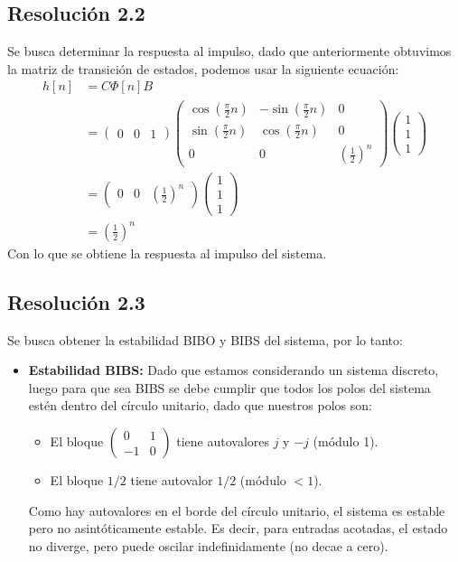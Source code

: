 \documentclass[
  11pt,
  letterpaper,
   addpoints,
   answers
  ]{exam}
\begin{document}
\begin{questions}
\begin{solution}
\subsection*{Resolución 2.2}
Se busca determinar la respuesta al impulso, dado que anteriormente obtuvimos la matriz de transición de estados, podemos usar la siguiente ecuación:
\begin{align}
  h[n]&= C\Phi[n] B\\
  &= \begin{pmatrix} 0 & 0 & 1 \end{pmatrix} \begin{pmatrix} \cos\left(\frac{\pi}{2} n\right) & -\sin\left(\frac{\pi}{2} n\right) & 0 \\ \sin\left(\frac{\pi}{2} n\right) & \cos\left(\frac{\pi}{2} n\right) & 0 \\ 0 & 0 & \left(\frac{1}{2}\right)^n \end{pmatrix} \begin{pmatrix} 1 \\ 1 \\ 1 \end{pmatrix}\\
  &= \begin{pmatrix} 0 & 0 & \left(\frac{1}{2}\right)^n \end{pmatrix} \begin{pmatrix} 1 \\ 1 \\ 1 \end{pmatrix}\\
  &= \left(\frac{1}{2}\right)^n
\end{align}
Con lo que se obtiene la respuesta al impulso del sistema.
\subsection*{Resolución 2.3}
Se busca obtener la estabilidad BIBO y BIBS del sistema, por lo tanto:
\begin{itemize}

  \item \textbf{Estabilidad BIBS:} Dado que estamos considerando un sistema discreto, luego para que sea BIBS se debe cumplir que todos los polos del sistema estén dentro del círculo unitario, dado que nuestros polos son:

  \begin{itemize}
    \item El bloque $\begin{pmatrix}0 & 1 \\ -1 & 0\end{pmatrix}$ tiene autovalores $j$ y $-j$ (módulo 1).
    \item El bloque $1/2$ tiene autovalor $1/2$ (módulo $<1$).
  \end{itemize}
  Como hay autovalores en el borde del círculo unitario, el sistema es estable pero no asintóticamente estable. Es decir, para entradas acotadas, el estado no diverge, pero puede oscilar indefinidamente (no decae a cero).


\end{itemize}
\end{solution}
\end{questions}
\end{document}

